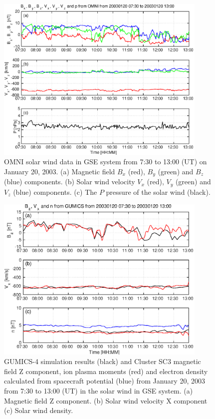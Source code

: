 \documentclass[linenumbers,draft]{agujournal}
\begin{document}
\begin{figure}[h]
\centering
\includegraphics[width=0.9\textwidth,angle=0]{swe-2021-corr-f02} 
\caption{OMNI solar wind data in GSE system from 7:30 to 13:00 (UT) on January 20, 2003. (a) Magnetic field $B_{x}$ (red), $B_{y}$ (green) and $B_{z}$ (blue) components. (b) Solar wind velocity $V_{x}$ (red), $V_{y}$ (green) and $V_{z}$ (blue) components. (c) The $P$ pressure of the solar wind (black).}

\label{fig:swomni}
\end{figure}

\pagebreak

\begin{figure}[h]
\centering
\includegraphics[width=0.9\textwidth,angle=0]{swe-2021-corr-f03} 
\caption{GUMICS-4 simulation results (black) and Cluster SC3 magnetic field Z component, ion plasma moments (red) and electron density calculated from spacecraft potential (blue) from January 20, 2003 from 7:30 to 13:00 (UT) in the solar wind in GSE system. (a) Magnetic field Z component. (b) Solar wind velocity X component (c) Solar wind density.}
\label{fig:swplot}
\end{figure}
\end{document}
